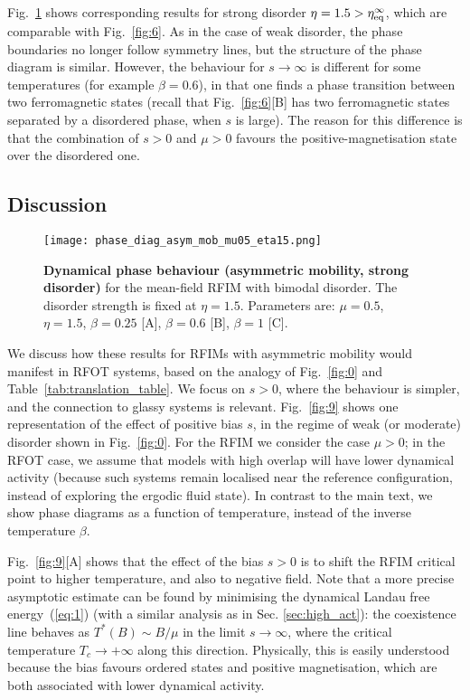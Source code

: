 \documentclass{iopart}
\begin{document}
Fig.~\ref{fig:8} shows corresponding results for strong disorder $\eta=1.5 > \eta^{\infty}_{\rm eq}$, which are comparable with Fig.~\ref{fig:6}.
As in the case of weak disorder, the phase boundaries no longer follow symmetry lines, but the structure of the phase diagram is similar.
However, the behaviour for $s\to\infty$ is different for some temperatures (for example $\beta=0.6$), in that one finds a phase transition between two ferromagnetic states (recall that Fig.~\ref{fig:6}[B] has two ferromagnetic states separated by a disordered phase, when $s$ is large).  
The reason for this difference is that the combination of $s>0$ and $\mu>0$ favours the positive-magnetisation state over the disordered one.


\subsection{Discussion}
\label{sec:discuss}


\begin{figure}
  \centering
  \texttt{[image: phase\_diag\_asym\_mob\_mu05\_eta15.png]} 
  \caption{\textbf{Dynamical phase behaviour (asymmetric mobility, strong disorder)} for the mean-field RFIM with bimodal disorder.  The disorder strength is fixed at $\eta=1.5$. Parameters are:  $\mu=0.5$,  $\eta=1.5$, $\beta=0.25$ [A], $\beta=0.6$ [B], $\beta=1$ [C].
}
  \label{fig:8}
\end{figure}


We discuss how these results for RFIMs with asymmetric mobility would manifest in RFOT systems, based on the analogy of Fig.~\ref{fig:0} and Table~\ref{tab:translation_table}.
We focus on $s>0$, where the behaviour is simpler, and the connection to glassy systems is relevant.
Fig.~\ref{fig:9} shows one representation of the effect of positive bias $s$, in the regime of weak (or moderate) disorder shown in Fig.~\ref{fig:0}.  For the RFIM we consider the case $\mu>0$; in the RFOT case, we assume that models with high overlap will have lower dynamical activity (because such systems remain localised near the reference configuration, instead of exploring the ergodic fluid state).  In contrast to the main text, we show phase diagrams as a function of temperature, instead of the inverse temperature $\beta$.  

Fig.~\ref{fig:9}[A] shows that the effect of the bias $s>0$ is to shift the RFIM critical point to higher temperature, and also to negative field.
Note that a more precise asymptotic estimate can be found by minimising the dynamical Landau free energy~(\ref{eq:1}) (with a similar analysis as in Sec. \ref{sec:high_act}): the coexistence line behaves as $T^{\ast}(B)\sim B/\mu$ in the limit $s\to\infty$, where the critical temperature $T_c\to +\infty$ along this direction.
Physically, this is easily understood because the bias favours ordered states and positive magnetisation, which are both associated with lower dynamical activity.
\end{document}
